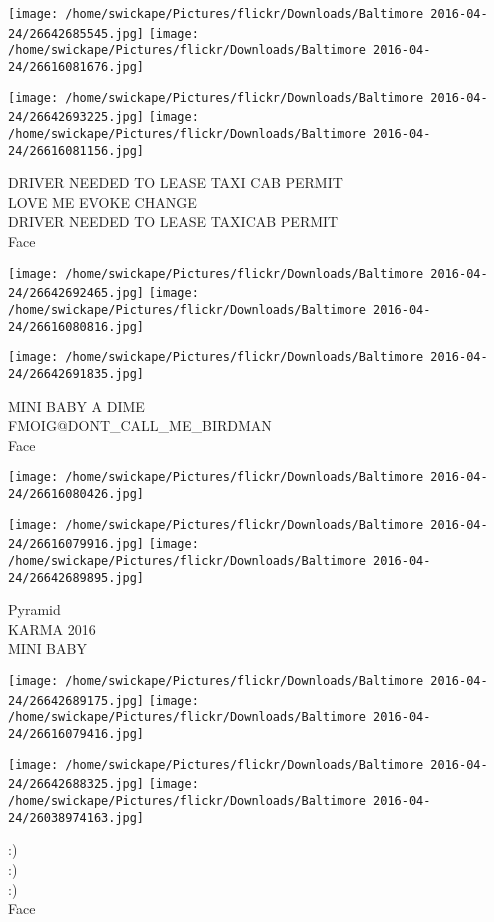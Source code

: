 \documentclass[10pt,letterpaper]{article}
\begin{document}
\texttt{[image: /home/swickape/Pictures/flickr/Downloads/Baltimore 2016-04-24/26642685545.jpg]}
\texttt{[image: /home/swickape/Pictures/flickr/Downloads/Baltimore 2016-04-24/26616081676.jpg]}

\texttt{[image: /home/swickape/Pictures/flickr/Downloads/Baltimore 2016-04-24/26642693225.jpg]}
\texttt{[image: /home/swickape/Pictures/flickr/Downloads/Baltimore 2016-04-24/26616081156.jpg]}

DRIVER NEEDED TO LEASE TAXI CAB PERMIT\\
LOVE ME EVOKE CHANGE\\
DRIVER NEEDED TO LEASE TAXICAB PERMIT\\
Face
\pagebreak

\texttt{[image: /home/swickape/Pictures/flickr/Downloads/Baltimore 2016-04-24/26642692465.jpg]}
\texttt{[image: /home/swickape/Pictures/flickr/Downloads/Baltimore 2016-04-24/26616080816.jpg]}

\texttt{[image: /home/swickape/Pictures/flickr/Downloads/Baltimore 2016-04-24/26642691835.jpg]}

MINI BABY A DIME\\
FMOIG@DONT\_CALL\_ME\_BIRDMAN\\
Face
\pagebreak

\texttt{[image: /home/swickape/Pictures/flickr/Downloads/Baltimore 2016-04-24/26616080426.jpg]}

\vspace{0.25in}
\texttt{[image: /home/swickape/Pictures/flickr/Downloads/Baltimore 2016-04-24/26616079916.jpg]}
\texttt{[image: /home/swickape/Pictures/flickr/Downloads/Baltimore 2016-04-24/26642689895.jpg]}

Pyramid\\
KARMA 2016\\
MINI BABY
\pagebreak

\texttt{[image: /home/swickape/Pictures/flickr/Downloads/Baltimore 2016-04-24/26642689175.jpg]}
\texttt{[image: /home/swickape/Pictures/flickr/Downloads/Baltimore 2016-04-24/26616079416.jpg]}

\texttt{[image: /home/swickape/Pictures/flickr/Downloads/Baltimore 2016-04-24/26642688325.jpg]}
\texttt{[image: /home/swickape/Pictures/flickr/Downloads/Baltimore 2016-04-24/26038974163.jpg]}

:)\\
:)\\
:)\\
Face
\pagebreak
\end{document}

